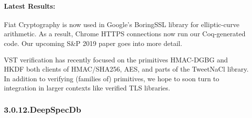 \documentclass[12pt,twoside]{article}
\begin{document}
\paragraph{Latest Results:}\label{sec-latest-results-}%

\noindent{}Fiat Cryptography is now used in Google's BoringSSL library for
elliptic-curve arithmetic.  As a result, Chrome HTTPS connections now
run our Coq-generated code.  Our  upcoming S\&P 2019 paper goes into
more detail.%

VST verification has recently focused on the primitives HMAC-DGBG and
HKDF \textendash{} both clients of HMAC/SHA256, AES, and parts of the TweetNaCl
library. In addition to verifying (families of) primitives, we hope to
soon turn to integration in larger contexts like verified TLS
libraries.%

\subsubsection{3.0.12.\hspace*{0.5em}DeepSpecDb}\label{sec-deepspecdb}%
\end{document}

